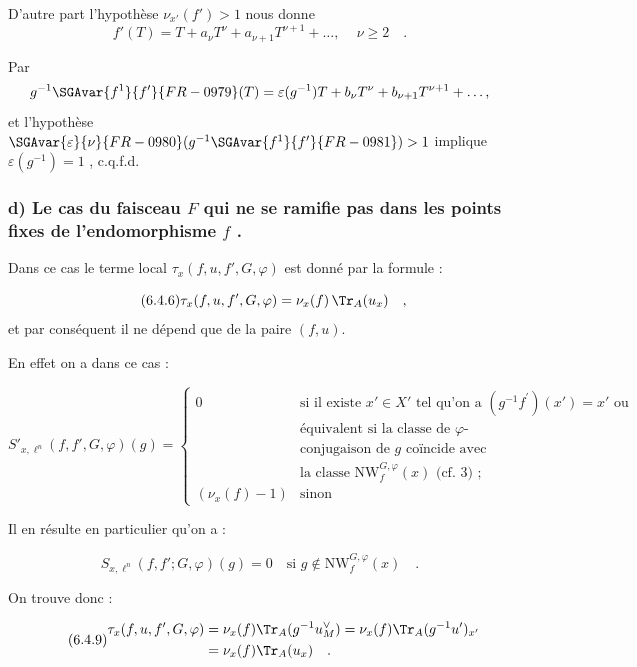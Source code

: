 D'autre part l'hypothèse $\nu_{x'}(f') > 1$ nous donne
\[
f'(T) = T + a_\nu T^\nu + a_{\nu+1} T^{\nu+1} + \ldots \text{, } \quad \nu \geq 2 \quad .
\]

Par 
\[
g^{-1}\SGAvar{f^{1}}{f^{\prime}}{FR-0979}(T) = \varepsilon(g^{-1})T + b_\nu T^\nu + b_{\nu+1} T^{\nu+1} + \ldots \text{,}
\]
et l'hypothèse $\SGAvar{\varepsilon}{\nu}{FR-0980}(g^{-1}\SGAvar{f^{1}}{f^{\prime}}{FR-0981}) > 1$ implique $\varepsilon(g^{-1}) = 1$ , c.q.f.d.

\subsubsection*{d) Le cas du faisceau $F$ qui ne se ramifie pas dans les points fixes de l'endomorphisme $f$ .}

Dans ce cas le terme local $\tau_x(f,u, f', G, \varphi)$ est donné par la formule :

\begin{equation}\tag{6.4.6}
\tau_x(f,u, f', G, \varphi) = \nu_x(f) \, \Tr_A(u_x) \quad ,
\end{equation}
et par conséquent il ne dépend que de la paire $(f,u)$.

En effet on a dans ce cas :

\begin{equation}\tag{6.4.7}
S'_{x,\ell^n}(f, f', G, \varphi)(g) = \begin{cases}
0 & \text{si il existe } x' \in X' \text{ tel qu'on a } (g^{-1}f^{\prime})(x') = x' \text{ ou}\\
& \text{équivalent si la classe de $\varphi$-}\\
& \text{conjugaison de $g$ coïncide avec}\\
& \text{la classe } \mathrm{NW}_{f}^{G,\varphi}(x) \text{ (cf. 3) ;}\\
(\nu_x(f)-1) & \text{sinon}
\end{cases}
\end{equation}

Il en résulte en particulier qu'on a :

\begin{equation}\tag{6.4.8}
S_{x,\ell^n}(f, f'; G, \varphi)(g) = 0 \quad \text{si } g \notin \mathrm{NW}_{f}^{G,\varphi}(x) \quad .
\end{equation}

On trouve donc :

\begin{equation}\tag{6.4.9}
\begin{aligned}
\tau_x(f,u, f', G, \varphi) &= \nu_x(f) \Tr_A(g^{-1}u_M^\vee) = \nu_x(f) \Tr_A(g^{-1}u')_{x'} \\
&= \nu_x(f) \Tr_A(u_x) \quad .
\end{aligned}
\end{equation}

